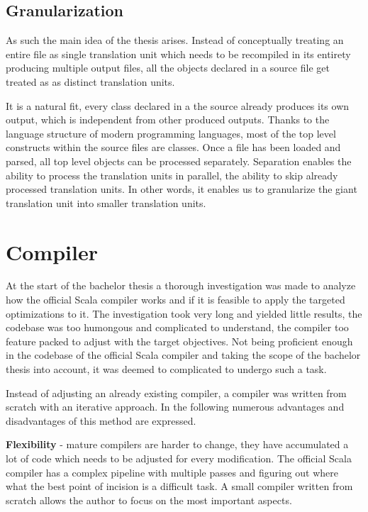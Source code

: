 \documentclass{VUMIFPSbakalaurinis}
\begin{document}
\subsection{Granularization}

As such the main idea of the thesis arises.
Instead of conceptually treating an entire file as single translation unit which needs to be recompiled in its entirety producing multiple output files, all the objects declared in a source file get treated as as distinct translation units.

It is a natural fit, every class declared in a the source already produces its own output, which is independent from other produced outputs.
Thanks to the language structure of modern programming languages, most of the top level constructs within the source files are classes.
Once a file has been loaded and parsed, all top level objects can be processed separately.
Separation enables the ability to process the translation units in parallel, the ability to skip already processed translation units. In other words, it enables us to granularize the giant translation unit into smaller translation units.


\section{Compiler}
At the start of the bachelor thesis a thorough investigation was made to analyze how the official Scala compiler works \cite{ScalaGithub} and if it is feasible to apply the targeted optimizations to it.
The investigation took very long and yielded little results, the codebase was too humongous and complicated to understand, the compiler too feature packed to adjust with the target objectives.
Not being proficient enough in the codebase of the official Scala compiler and taking the scope of the bachelor thesis into account, it was deemed to complicated to undergo such a task.

Instead of adjusting an already existing compiler, a compiler was written from scratch with an iterative approach.
In the following numerous advantages and disadvantages of this method are expressed.

\textbf{Flexibility} - mature compilers are harder to change, they have accumulated a lot of code which needs to be adjusted for every modification.
The official Scala compiler has a complex pipeline with multiple passes and figuring out where what the best point of incision is a difficult task.
A small compiler written from scratch allows the author to focus on the most important aspects.
\end{document}
